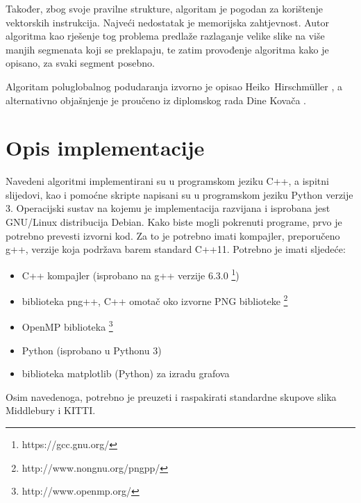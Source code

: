 \documentclass[utf8, zavrsni, numeric]{fer}
\begin{document}
Također, zbog svoje pravilne strukture, algoritam je pogodan za korištenje vektorskih instrukcija. Najveći nedostatak je memorijska zahtjevnost. Autor algoritma kao rješenje tog problema predlaže
razlaganje velike slike na više manjih segmenata koji se preklapaju, te zatim provođenje algoritma kako je opisano, za svaki segment posebno.

Algoritam poluglobalnog podudaranja izvorno je opisao Heiko~Hirschm{\"u}ller \cite{hirschmuller2008stereo}, a alternativno objašnjenje je proučeno iz diplomskog rada Dine Kovača \cite{kovac15ms}.

\chapter{Opis implementacije}

Navedeni algoritmi implementirani su u programskom jeziku C++, a ispitni slijedovi, kao i pomoćne skripte napisani su u programskom jeziku Python verzije 3.
Operacijski sustav na kojemu je implementacija razvijana i isprobana jest GNU/Linux distribucija Debian.
Kako biste mogli pokrenuti programe, prvo je potrebno prevesti izvorni kod. Za to je potrebno imati kompajler, preporučeno g++, verzije koja podržava barem standard C++11.
Potrebno je imati sljedeće:
\begin{itemize}
\item C++ kompajler (isprobano na g++ verzije 6.3.0 \footnote{https://gcc.gnu.org/})
\item biblioteka png++, C++ omotač oko izvorne PNG biblioteke \footnote{http://www.nongnu.org/pngpp/}
\item OpenMP biblioteka \footnote{http://www.openmp.org/}
\item Python (isprobano u Pythonu 3)
\item biblioteka matplotlib (Python) za izradu grafova
\end{itemize}

Osim navedenoga, potrebno je preuzeti i raspakirati standardne skupove slika Middlebury i
KITTI.
\end{document}
